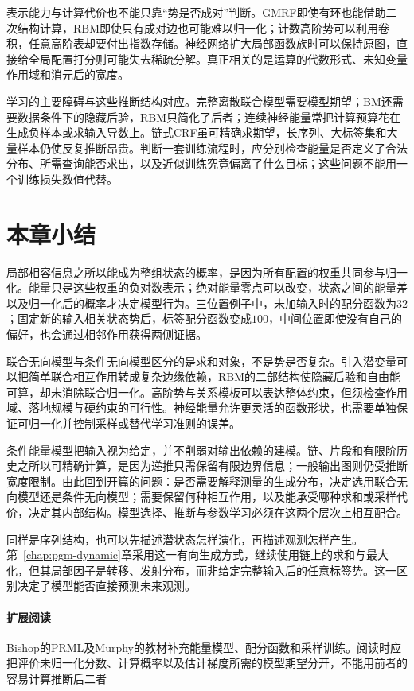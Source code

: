 表示能力与计算代价也不能只靠“势是否成对”判断。GMRF即使有环也能借助二次结构计算，RBM即使只有成对边也可能难以归一化；计数高阶势可以利用卷积，任意高阶表却要付出指数存储。神经网络扩大局部函数族时可以保持原图，直接给全局配置打分则可能失去稀疏分解。真正相关的是运算的代数形式、未知变量作用域和消元后的宽度。

学习的主要障碍与这些推断结构对应。完整离散联合模型需要模型期望；BM还需要数据条件下的隐藏后验，RBM只简化了后者；连续神经能量常把计算预算花在生成负样本或求输入导数上。链式CRF虽可精确求期望，长序列、大标签集和大量样本仍使反复推断昂贵。判断一套训练流程时，应分别检查能量是否定义了合法分布、所需查询能否求出，以及近似训练究竟偏离了什么目标；这些问题不能用一个训练损失数值代替。

\section{本章小结}
\label{sec:pgm-energy-models-summary}

局部相容信息之所以能成为整组状态的概率，是因为所有配置的权重共同参与归一化。能量只是这些权重的负对数表示；绝对能量零点可以改变，状态之间的能量差以及归一化后的概率才决定模型行为。三位置例子中，未加输入时的配分函数为$32$；固定新的输入相关状态势后，标签配分函数变成$100$，中间位置即使没有自己的偏好，也会通过相邻作用获得两侧证据。

联合无向模型与条件无向模型区分的是求和对象，不是势是否复杂。引入潜变量可以把简单联合相互作用转成复杂边缘依赖，RBM的二部结构使隐藏后验和自由能可算，却未消除联合归一化。高阶势与关系模板可以表达整体约束，但须检查作用域、落地规模与硬约束的可行性。神经能量允许更灵活的函数形状，也需要单独保证可归一化并控制采样或替代学习准则的误差。

条件能量模型把输入视为给定，并不削弱对输出依赖的建模。链、片段和有限阶历史之所以可精确计算，是因为递推只需保留有限边界信息；一般输出图则仍受推断宽度限制。由此回到开篇的问题：是否需要解释测量的生成分布，决定选用联合无向模型还是条件无向模型；需要保留何种相互作用，以及能承受哪种求和或采样代价，决定其内部结构。模型选择、推断与参数学习必须在这两个层次上相互配合。

同样是序列结构，也可以先描述潜状态怎样演化，再描述观测怎样产生。第~\ref{chap:pgm-dynamic}章采用这一有向生成方式，继续使用链上的求和与最大化，但其局部因子是转移、发射分布，而非给定完整输入后的任意标签势。这一区别决定了模型能否直接预测未来观测。

\paragraph{扩展阅读}
Bishop的PRML及Murphy的教材补充能量模型、配分函数和采样训练。阅读时应把评价未归一化分数、计算概率以及估计梯度所需的模型期望分开，不能用前者的容易计算推断后二者
